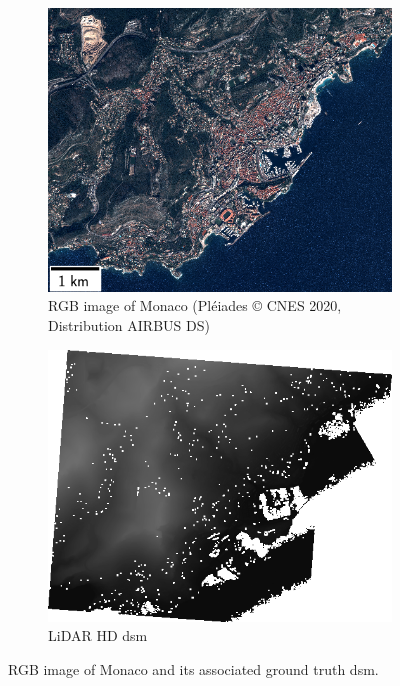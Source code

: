 \begin{figure}
    \centering
    \begin{subfigure}[t]{0.48\linewidth}
        \flushleft
        \includegraphics[width=\linewidth]{Images/Chap_6/miniature_Monaco.png}
        \caption{RGB image of Monaco (Pléiades © CNES 2020, Distribution AIRBUS DS)}
        \label{fig:miniature_Monaco_rgb}
    \end{subfigure}\hfill
    \begin{subfigure}[t]{0.48\linewidth}
        \flushright
        \includegraphics[width=\linewidth]{Images/Chap_6/miniature_Monaco_gt.png}
        \caption{LiDAR HD \acrshort{dsm}}
        \label{fig:miniature_Monaco_gt}
    \end{subfigure}
    \caption{RGB image of Monaco and its associated ground truth \acrshort{dsm}.}
    \label{fig:miniature_Monaco}
\end{figure}

